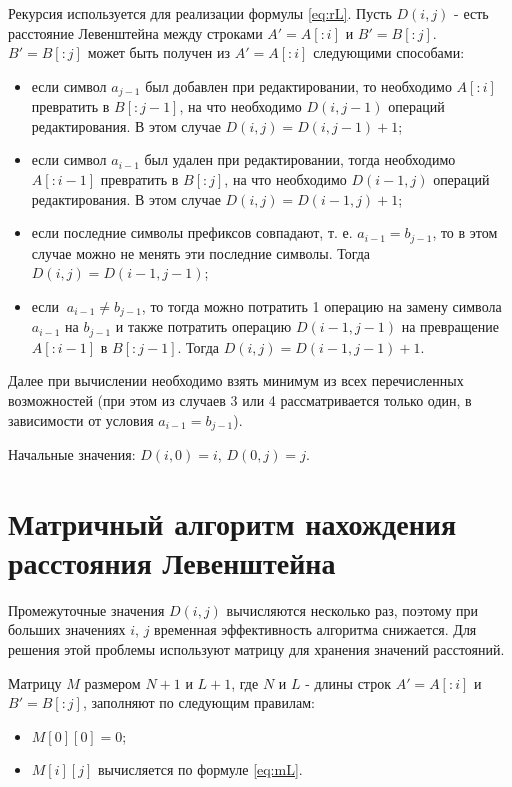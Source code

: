 Рекурсия используется для реализации формулы \ref{eq:rL}. Пусть $D(i,j)$ - есть расстояние Левенштейна между строками $A'= A[:i]$ и $B' = B[:j]$. $B' = B[:j]$ может быть получен из $A'= A[:i]$ следующими способами:

\begin{itemize}
	\item если символ $a_{j-1}$ был добавлен при редактировании, то необходимо $A[:i]$ превратить в $B[:j-1]$, на что необходимо $D(i,j-1)$ операций редактирования. В этом случае $D(i,j) = D(i,j-1) + 1$;
	\item если символ $a_{i-1}$ был удален при редактировании, тогда необходимо $A[:i-1]$ превратить в $B[:j]$, на что необходимо $D(i-1,j)$ операций редактирования. В этом случае $D(i,j) = D(i-1,j) + 1$;
	\item если последние символы префиксов совпадают, т. е. $a_{i-1} = b_{j-1}$, то в этом случае можно не менять эти последние символы. Тогда $D(i,j) = D(i-1,j-1)$;
	\item если $\medspace a_{i-1} \neq b_{j-1}$, то тогда можно потратить 1 операцию на замену символа $a_{i-1}$ на $b_{j-1}$ и также потратить  операцию $D(i-1,j-1)$ на превращение $A[:i-1]$ в $B[:j-1]$. Тогда $D(i,j) = D(i-1,j-1) + 1$.
\end{itemize}

Далее при вычислении  необходимо взять минимум из всех перечисленных возможностей (при этом из случаев 3 или 4 рассматривается только один, в зависимости от условия $a_{i-1} = b_{j-1}$).

Начальные значения: $D(i,0) = i$, $D(0,j) = j$.

\section{Матричный алгоритм нахождения расстояния Левенштейна}

Промежуточные значения $D(i,j)$ вычисляются несколько раз, поэтому при больших значениях $i$, $j$ временная эффективность алгоритма снижается. Для решения этой проблемы используют матрицу для хранения значений расстояний.

Матрицу $M$ размером $N+1$ и $L+1$, где $N$ и $L$ - длины строк $A'= A[:i]$ и $B' = B[:j]$, заполняют по следующим правилам:

\begin{itemize}
	\item $M[0][0] = 0$;
	\item $M[i][j]$ вычисляется по формуле \ref{eq:mL}.
\end{itemize}

